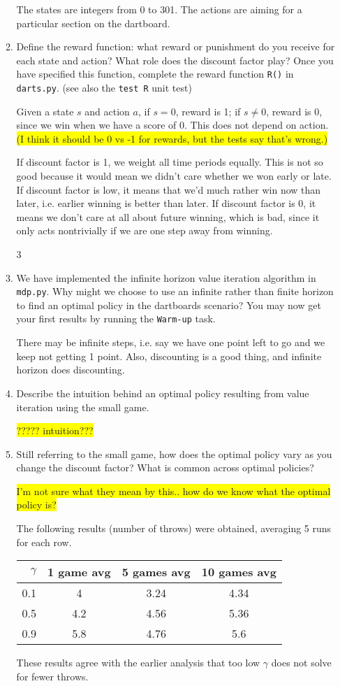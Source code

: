 \documentclass{article}
\newcommand{\edit}[1]{\colorbox{Yellow}{#1}}
\begin{document}
\begin{enumerate}
\begin{enumerate}
  The states are integers from 0 to 301. The actions are aiming for a
  particular section on the dartboard.  

  \item {Define the reward function: what reward or punishment
  do you receive for each state and action? What role does the discount
  factor play? Once you have specified this function, complete the
  reward function \texttt{R()} in \texttt{darts.py}. (see also the 
  \texttt{test R} unit test)}

  Given a state $s$ and action $a$, if $s=0$, reward is 1; if $s\neq 0$,
  reward is 0, since we win when we have a score of 0. This does not
  depend on action. 
  \edit{(I think it should be 0 vs -1 for rewards, but the tests say that's wrong.)}

  If discount factor is 1, we weight all time periods equally. This is
  not so good because it would mean we didn't care whether we won early
  or late. If discount factor is low, it means that we'd much rather win
  now than later, i.e. earlier winning is better than later. 
  If discount factor is 0, it means we don't care at all about future
  winning, which is bad, since it only acts nontrivially if we are one
  step away from winning. 

  \setcounter{enumii}3
  \item {We have implemented the infinite horizon value iteration
  algorithm in \texttt{mdp.py}. Why might we choose to use an infinite rather
  than finite horizon to find an optimal policy in the dartboards scenario? 
  You may now get your first results by running the \texttt{Warm-up} task.}

  There may be infinite steps, i.e. say we have one point left to go
  and we keep not getting 1 point. 
  Also, discounting is a good thing, and infinite horizon does discounting.  
  
  \item {Describe the intuition behind an optimal policy resulting
  from value iteration using the small game.}

  \edit{????? intuition???}

  \item {Still referring to the small game, how does the optimal
  policy vary as you change the discount factor? What is common
  across optimal policies?}

  \edit{I'm not sure what they mean by this.. how do we know what the optimal policy is?}

  The following results (number of throws) were obtained, averaging 5 runs for each row.
  \begin{tabular}{r|c c c}
  $\gamma$ & 1 game avg & 5 games avg & 10 games avg \\
  \hline
  0.1 & 4 & 3.24 & 4.34 \\
  0.5 & 4.2 & 4.56 & 5.36 \\
  0.9 & 5.8 & 4.76 & 5.6 \\
  \end{tabular}
  These results agree with the earlier analysis that too low $\gamma$
  does not solve for fewer throws. 


\end{enumerate}
\end{enumerate}
\end{document}
